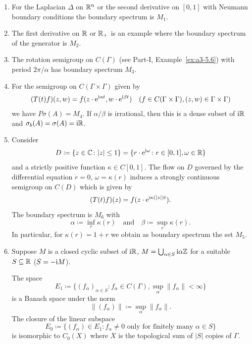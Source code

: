 \begin{examples}\label{ex:b3-2.6}%
\begin{enumerate}[\upshape (i), wide, labelindent=.25em]
\item
For the Laplacian 
 $\Delta$ on $\mathbb{R}^{n}$ or the second derivative on $[0,1]$ with Neumann boundary conditions the boundary spectrum is $M_{1}$.
	
\item
The first derivative on $\mathbb{R}$ or $\mathbb{R}_{+}$ is an example where the boundary spectrum of the generator is $M_{2}$.
	
\item
The rotation semigroup%
 on $C(\Gamma)$ (see Part-I, Example~\ref{ex:a3-5.6}) with period $2\pi/\alpha$ has boundary spectrum $M_{3}$.

\item
For the semigroup on $C(\Gamma \times \Gamma)$ given by
	\[
	(T(t)f)(z,w) = f(z\cdot \mathrm{e}^{\mathrm{i}\alpha t},w\cdot \mathrm{e}^{\mathrm{i}\beta  t}) \quad (f \in C(\Gamma \times \Gamma), (z,w) \in \Gamma \times \Gamma)
	\]
	we have $P\sigma(A) = M_{4}$.
	If\/ $\alpha/\beta$ is irrational, then this is a dense subset of\/ $\mathrm{i} \mathbb{R}$ and $\sigma_{b}(A) = \sigma(A) = \mathrm{i}\mathbb{R}$.
	
\item
Consider %
\[
	D \coloneq \{z \in \C \colon |z| \leq 1\} = \{r\cdot \eu^{\im\omega} \colon r \in [0,1], \omega \in \R\} 
\]
%
and a strictly positive function $\kappa \in C[0,1]$.
The flow on $D$ governed by the differential equation $\dot{r} = 0$, $\dot{\omega} = \kappa(r)$ induces a strongly continuous semigroup on $C(D)$ which is given by
\[
	(T(t)f)(z) = f(z\cdot \mathrm{e}^{\mathrm{i}\kappa(|z|)t}).
\]
The boundary spectrum is $M_{6}$ with 
%
\[
	\alpha \coloneq \inf_r \kappa(r) 
	\quad \text{and} \quad 
	\beta \coloneq \sup_r \kappa(r).
\]
%
In particular, for $\kappa(r) = 1 + r$ we obtain as boundary spectrum the set $M_{5}$.
	
\item
Suppose $M$ is a closed cyclic subset of\/ $\mathrm{i} \mathbb{R}$, $M = \bigcup_{\alpha \in S} \mathrm{i}\alpha\mathbb{Z}$ for a suitable $S \subseteq \mathbb{R}$ (\eg $S = -\mathrm{i} M$).
	
The space 
\[
E_{1} \coloneq \{(f_{\alpha})_{\alpha \in S} \colon f_{\alpha} \in C(\Gamma), \sup_\alpha \|f_{\alpha}\| < \infty\}
\] 
is a Banach space under the norm 
\[
\|(f_{\alpha})\| \coloneq \sup_\alpha \|f_{\alpha}\| .
\]
The closure of the linear subspace 
\[
E_{0} \coloneq \{(f_{\alpha}) \in E_{1} \colon f_{\alpha} \neq 0 \text{ only for finitely many } \alpha \in S\}
\]
is isomorphic to $C_{0}(X)$ where $X$ is the topological sum of\/ $|S|$ copies of\/ $\Gamma$.
	

\end{enumerate}
\end{examples}
